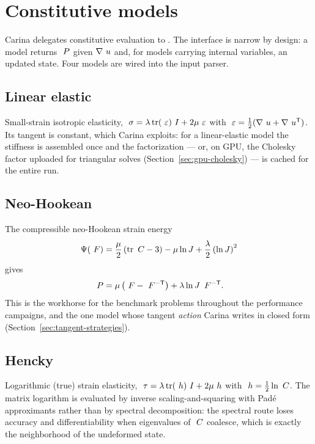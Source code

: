 \chapter{Constitutive models}
\label{ch:constitutive}

Carina delegates constitutive evaluation to .  The
interface is narrow by design: a model returns $~P$ given $\nabla~u$ and,
for models carrying internal variables, an updated state.  Four models are
wired into the input parser.

\section{Linear elastic}

Small-strain isotropic elasticity, $~\sigma = \lambda\operatorname{tr}(~\varepsilon)~I +
2\mu~\varepsilon$ with $~\varepsilon = \tfrac12(\nabla~u +
\nabla~u^{\mathsf{T}})$.  Its tangent is constant, which Carina exploits: for
a linear-elastic model the stiffness is assembled once and the factorization
--- or, on GPU, the Cholesky factor uploaded for triangular solves
(Section~\ref{sec:gpu-cholesky}) --- is cached for the entire run.

\section{Neo-Hookean}

The compressible neo-Hookean strain energy
\begin{equation}
  \Psi(~F) = \frac{\mu}{2}\left(\operatorname{tr}~C - 3\right) - \mu \ln J
              + \frac{\lambda}{2}\left(\ln J\right)^2
\end{equation}
gives
\begin{equation}
  ~P = \mu\left(~F - ~F^{-\mathsf{T}}\right)
         + \lambda \ln J \, ~F^{-\mathsf{T}} .
\end{equation}
This is the workhorse for the benchmark problems throughout the performance
campaigns, and the one model whose tangent \emph{action} Carina writes in
closed form (Section~\ref{sec:tangent-strategies}).

\section{Hencky}

Logarithmic (true) strain elasticity, $~\tau = \lambda\operatorname{tr}(~h)~I +
2\mu~h$ with $~h = \tfrac12\ln~C$.  The matrix logarithm is
evaluated by inverse scaling-and-squaring with Pad\'e approximants rather than
by spectral decomposition: the spectral route loses accuracy and
differentiability when eigenvalues of $~C$ coalesce, which is exactly the
neighborhood of the undeformed state.


